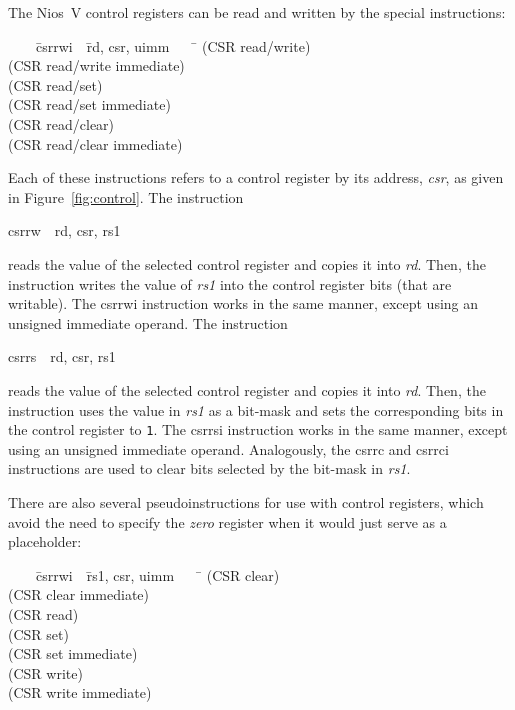 \documentclass[11pt, twoside, pdftex]{article}
\newenvironment{ctabbing}%
{\begin{center}\begin{minipage}{\textwidth}\begin{tabbing}}
{\end{tabbing}\end{minipage}\end{center}}
\begin{document}
The Nios~V control registers can be read and written by the special instructions:
\begin{ctabbing}
~~~~\={\sf csrrwi}~~\={\sf rd, csr, uimm}~~~~\=\kill
{}  \>(CSR read/write)\\
  \>(CSR read/write immediate)\\
  \>(CSR read/set)\\
  \>(CSR read/set immediate)\\
  \>(CSR read/clear)\\
  \>(CSR read/clear immediate)\\
\end{ctabbing}
\vspace{-\baselineskip}
\noindent
Each of these instructions refers to a control register by its address, {\it csr}, as
given in Figure~\ref{fig:control}.  The instruction
\vspace{-\baselineskip}
\begin{center}
{\sf csrrw~~rd, csr, rs1} 
\end{center}
reads the value of the selected control register and copies it into {\it rd}. Then, the 
instruction writes the value of {\it rs1} into the control register bits (that are
writable). The {\sf csrrwi} instruction works in the same manner, except using an unsigned
immediate operand.
The instruction
\vspace{-\baselineskip}
\begin{center}
{\sf csrrs~~rd, csr, rs1} 
\end{center}
reads the value of the selected control register and copies it into {\it rd}. Then, the 
instruction uses the value in {\it rs1} as a bit-mask and sets the corresponding bits in the 
control register to \texttt{1}.  The {\sf csrrsi} instruction works in the same manner, 
except using an unsigned immediate operand.
Analogously, the {\sf csrrc} and {\sf csrrci} 
instructions are used to clear bits selected by the bit-mask in {\it rs1}. 

There are also several pseudoinstructions for use with control registers, which avoid the
need to specify the {\it zero} register when it would just serve as a placeholder:
\begin{ctabbing}
~~~~\={\sf csrrwi}~~\={\sf rs1, csr, uimm}~~~~\=\kill
{}  \>(CSR clear)\\
  \>(CSR clear immediate)\\
  \>(CSR read)\\
  \>(CSR set)\\
  \>(CSR set immediate)\\
  \>(CSR write)\\
  \>(CSR write immediate)\\
\end{ctabbing}
\vspace{-\baselineskip}
\end{document}
